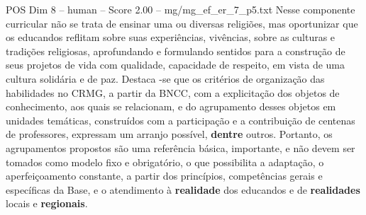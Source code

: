 \begin{textsample}{POS Dim 8 – human – Score 2.00 – mg/mg\_ef\_er\_7\_p5.txt}  \label{ex:f8_pos_018}
Nesse componente curricular não se trata de ensinar uma ou diversas religiões, mas oportunizar que os educandos reflitam sobre suas experiências, vivências, sobre as culturas e tradições religiosas, aprofundando e formulando sentidos para a construção de seus projetos de vida com qualidade, capacidade de respeito, em vista de uma cultura solidária e de paz.
Destaca -se que os critérios de organização das habilidades no CRMG, a partir da BNCC, com a explicitação dos objetos de conhecimento, aos quais se relacionam, e do agrupamento desses objetos em unidades temáticas, construídos com a participação e a contribuição de centenas de professores, expressam um arranjo possível, \textbf{dentre} outros.
Portanto, os agrupamentos propostos são uma referência básica, importante, e não devem ser tomados como modelo fixo e obrigatório, o que possibilita a adaptação, o aperfeiçoamento constante, a partir dos princípios, competências gerais e específicas da Base, e o atendimento à \textbf{realidade} dos educandos e de \textbf{realidades} locais e \textbf{regionais}.

\end{textsample}
